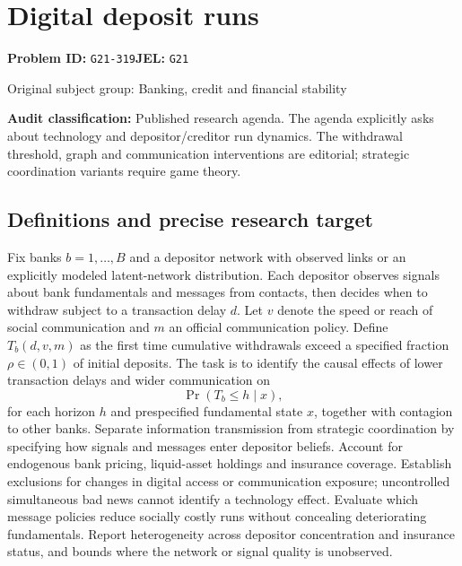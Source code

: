 \documentclass[11pt,a4paper]{article}
\begin{document}
\section*{Digital deposit runs}
\textbf{Problem ID:} \texttt{G21-319}\quad \textbf{JEL:} \texttt{G21}\par
\label{problem:OP-0322}
{\sffamily\small\color{muted}Original subject group: Banking, credit and financial stability\par}
\label{definitions:problem:30007604}
\textbf{Audit classification:} Published research agenda. The agenda explicitly asks about technology and depositor/creditor run dynamics. The withdrawal threshold, graph and communication interventions are editorial; strategic coordination variants require game theory.
\subsection*{Definitions and precise research target}
Fix banks \(b=1,\ldots,B\) and a depositor network with observed links or an explicitly modeled latent-network distribution. Each depositor observes signals about bank fundamentals and messages from contacts, then decides when to withdraw subject to a transaction delay \(d\). Let \(v\) denote the speed or reach of social communication and \(m\) an official communication policy. Define \(T_b(d,v,m)\) as the first time cumulative withdrawals exceed a specified fraction \(\rho\in(0,1)\) of initial deposits. The task is to identify the causal effects of lower transaction delays and wider communication on
\[\Pr(T_b\leq h\mid x),\]
for each horizon \(h\) and prespecified fundamental state \(x\), together with contagion to other banks. Separate information transmission from strategic coordination by specifying how signals and messages enter depositor beliefs. Account for endogenous bank pricing, liquid-asset holdings and insurance coverage. Establish exclusions for changes in digital access or communication exposure; uncontrolled simultaneous bad news cannot identify a technology effect. Evaluate which message policies reduce socially costly runs without concealing deteriorating fundamentals. Report heterogeneity across depositor concentration and insurance status, and bounds where the network or signal quality is unobserved.
\end{document}
